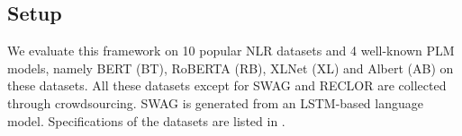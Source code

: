 \subsection{Setup} 
We evaluate this framework on 10 popular NLR datasets and
4 well-known PLM models, namely BERT (BT), RoBERTA (RB), XLNet (XL) and Albert (AB)
on these datasets. All these datasets except for SWAG and RECLOR are collected
through crowdsourcing. SWAG is generated from an LSTM-based language model.
Specifications of the datasets are listed in .



%
%
%
%
%
